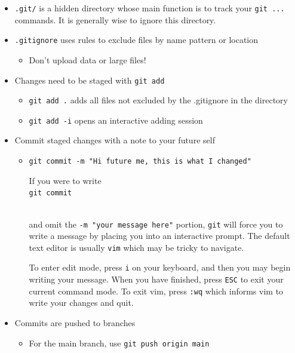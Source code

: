 \documentclass[
  letterpaper,
  DIV=11,
  numbers=noendperiod]{scrreprt}
\providecommand{\tightlist}{%
  \setlength{\itemsep}{0pt}\setlength{\parskip}{0pt}}\usepackage{longtable,booktabs,array}
\begin{document}
\begin{itemize}
\item
  \texttt{.git/} is a hidden directory whose main function is to track
  your \texttt{git\ ...} commands. It is generally wise to ignore this
  directory.
\item
  \texttt{.gitignore} uses rules to exclude files by name pattern or
  location

  \begin{itemize}
  \tightlist
  \item
    Don't upload data or large files!
  \end{itemize}
\item
  Changes need to be staged with \texttt{git\ add}

  \begin{itemize}
  \item
    \texttt{git\ add\ .} adds all files not excluded by the .gitignore
    in the directory
  \item
    \texttt{git\ add\ -i} opens an interactive adding session
  \end{itemize}
\item
  Commit staged changes with a note to your future self

  \begin{itemize}
  \item
    \texttt{git\ commit\ -m\ "Hi\ future\ me,\ this\ is\ what\ I\ changed"}

    \begin{tcolorbox}[enhanced jigsaw, left=2mm, colframe=quarto-callout-note-color-frame, leftrule=.75mm, opacitybacktitle=0.6, toptitle=1mm, title=\textcolor{quarto-callout-note-color}{\faInfo}\hspace{0.5em}{Note}, opacityback=0, coltitle=black, colbacktitle=quarto-callout-note-color!10!white, breakable, colback=white, titlerule=0mm, bottomrule=.15mm, arc=.35mm, bottomtitle=1mm, rightrule=.15mm, toprule=.15mm]

    If you were to write\\
    \texttt{git\ commit}\strut \\
    and omit the \texttt{-m\ "your\ message\ here"} portion,
    \texttt{git} will force you to write a message by placing you into
    an interactive prompt. The default text editor is usually
    \texttt{vim} which may be tricky to navigate.

    To enter edit mode, press \texttt{i} on your keyboard, and then you
    may begin writing your message. When you have finished, press
    \texttt{ESC} to exit your current command mode. To exit vim, press
    \texttt{:wq} which informs vim to write your changes and quit.

    \end{tcolorbox}
  \end{itemize}
\item
  Commits are pushed to branches

  \begin{itemize}
  \tightlist
  \item
    For the main branch, use \texttt{git\ push\ origin\ main}
  \end{itemize}
\end{itemize}
\end{document}
